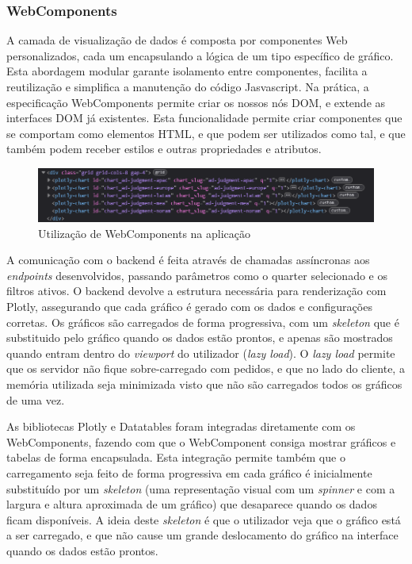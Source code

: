 \subsubsection{WebComponents}

A camada de visualização de dados é composta por componentes Web personalizados, cada um encapsulando a lógica de um tipo específico de gráfico. Esta abordagem modular garante isolamento entre componentes, facilita a reutilização e simplifica a manutenção do código Jasvascript. Na prática, a especificação WebComponents\cite{webcomponents} permite criar os nossos nós DOM, e extende as interfaces DOM já existentes. Esta funcionalidade permite criar componentes que se comportam como elementos HTML, e que podem ser utilizados como tal, e que também podem receber estilos e outras propriedades e atributos. 

\begin{figure}[H]
    \centering
    \includegraphics[width=\textwidth]{./img/webc}
 \caption{Utilização de WebComponents na aplicação}
 \end{figure}

A comunicação com o backend é feita através de chamadas assíncronas aos \textit{endpoints} desenvolvidos, passando parâmetros como o quarter selecionado e os filtros ativos. O backend devolve a estrutura necessária para renderização com Plotly, assegurando que cada gráfico é gerado com os dados e configurações corretas. Os gráficos são carregados de forma progressiva, com um \textit{skeleton} que é substituido pelo gráfico quando os dados estão prontos, e apenas são mostrados quando entram dentro do \textit{viewport} do utilizador (\textit{lazy load}). O \textit{lazy load} permite que os servidor não fique sobre-carregado com pedidos, e que no lado do cliente, a memória utilizada seja minimizada visto que não são carregados todos os gráficos de uma vez.	

As bibliotecas Plotly e Datatables foram integradas diretamente com os WebComponents\cite{webcomponents}, fazendo com que o WebComponent consiga mostrar gráficos e tabelas de forma encapsulada. Esta integração permite também que o carregamento seja feito de forma progressiva em cada gráfico é inicialmente substituído por um \textit{skeleton} (uma representação visual com um \textit{spinner} e com a largura e altura aproximada de um gráfico) que desaparece quando os dados ficam disponíveis. A ideia deste \textit{skeleton} é que o utilizador veja que o gráfico está a ser carregado, e que não cause um grande deslocamento do gráfico na interface quando os dados estão prontos.

